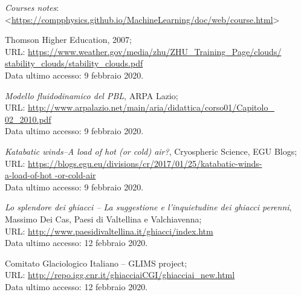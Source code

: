 
\begin{thesitography}
\item \textit{Courses notes}: <\url{https://compphysics.github.io/MachineLearning/doc/web/course.html}>

  Thomson Higher Education, 2007; \\ URL: \url{https://www.weather.gov/media/zhu/ZHU_Training_Page/clouds/} \\ \url{stability_clouds/stability_clouds.pdf} \\ Data ultimo accesso: 9 febbraio 2020.

  \textit{Modello fluidodinamico del PBL}, ARPA Lazio; \\ URL: \url{http://www.arpalazio.net/main/aria/didattica/corso01/Capitolo_} \\ \url{02_2010.pdf} \\ Data ultimo accesso: 9 febbraio 2020.

  \textit{Katabatic winds–A load of hot (or cold) air?}, Cryospheric Science, EGU Blogs; \\ URL: \url{https://blogs.egu.eu/divisions/cr/2017/01/25/katabatic-winds-} \\ \url{a-load-of-hot  -or-cold-air}\\ Data ultimo accesso: 9 febbraio 2020.

  \textit{Lo splendore dei ghiacci – La suggestione e l'inquietudine dei ghiacci perenni}, \\ Massimo Dei Cas, Paesi di Valtellina e Valchiavenna; \\ URL: \url{http://www.paesidivaltellina.it/ghiacci/index.htm}\\ Data ultimo accesso: 12 febbraio 2020.

 Comitato Glaciologico Italiano – GLIMS project; \\ URL: \url{http://repo.igg.cnr.it/ghiacciaiCGI/ghiacciai_new.html}\\ Data ultimo accesso: 12 febbraio 2020.

\end{thesitography}
